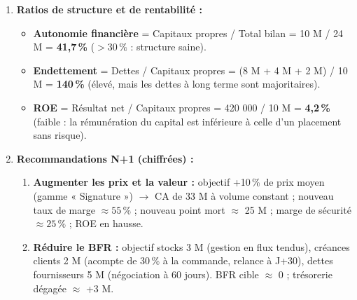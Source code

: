 \documentclass[11pt]{article}
\begin{document}
\begin{exoresolu}
\begin{enumerate}
              \begin{itemize}
                  \item \textbf{BFR} = Stocks (4 M) + Créances clients (3 M) - Dettes fournisseurs (4 M) = \textbf{3 000 000 FCFA} (besoin de financement du cycle d'exploitation).
                  \item \textbf{FRNG} = Capitaux propres (10 M) + Emprunt à long terme (8 M) - Actif immobilisé net (15 M) = \textbf{3 000 000 FCFA} (ressources stables restant après financement des investissements).
                  \item \textbf{Trésorerie nette (TN)} = FRNG - BFR = 3 M - 3 M = \textbf{0 FCFA} (cohérent avec : Banque 2 M - Dettes fiscales et sociales 2 M = 0).
                  \item \textbf{Interprétation :} équilibre précaire (TN = 0). Tout le FRNG est absorbé par le BFR : aucune marge de manœuvre pour absorber un retard de paiement client ou une hausse des stocks. \textbf{Urgence :} négocier les délais fournisseurs, relancer les clients, réduire les stocks.
              \end{itemize}
        \item \textbf{Ratios de structure et de rentabilité :}
              \begin{itemize}
                  \item \textbf{Autonomie financière} = Capitaux propres / Total bilan = 10 M / 24 M = \textbf{41,7\,\%} ($> 30\,\%$ : structure saine).
                  \item \textbf{Endettement} = Dettes / Capitaux propres = (8 M + 4 M + 2 M) / 10 M = \textbf{140\,\%} (élevé, mais les dettes à long terme sont majoritaires).
                  \item \textbf{ROE} = Résultat net / Capitaux propres = 420 000 / 10 M = \textbf{4,2\,\%} (faible : la rémunération du capital est inférieure à celle d'un placement sans risque).
              \end{itemize}
        \item \textbf{Recommandations N+1 (chiffrées) :}
              \begin{enumerate}
                  \item \textbf{Augmenter les prix et la valeur :} objectif +10\,\% de prix moyen (gamme « Signature ») $\to$ CA de 33 M à volume constant ; nouveau taux de marge $\approx 55\,\%$ ; nouveau point mort $\approx$ 25 M ; marge de sécurité $\approx 25\,\%$ ; ROE en hausse.
                  \item \textbf{Réduire le BFR :} objectif stocks 3 M (gestion en flux tendus), créances clients 2 M (acompte de 30\,\% à la commande, relance à J+30), dettes fournisseurs 5 M (négociation à 60 jours). BFR cible $\approx$ 0 ; trésorerie dégagée $\approx$ +3 M.

\end{enumerate}
\end{enumerate}
\end{exoresolu}
\end{document}
